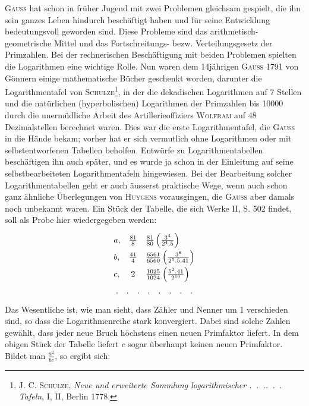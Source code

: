 \textsc{Gauss} hat schon in früher Jugend mit zwei Problemen gleichsam gespielt,
die ihn sein ganzes Leben hindurch beschäftigt haben und für seine Entwicklung bedeutungsvoll geworden sind. Diese Probleme sind das arithmetisch-geometrische Mittel und das Fortschreitungs- bezw. Verteilungsgesetz der Primzahlen. Bei der rechnerischen Beschäftigung mit beiden Problemen spielten
die Logarithmen eine wichtige Rolle. Nun waren dem 14jährigen \textsc{Gauss}
1791 von Gönnern einige mathematische Bücher geschenkt worden, darunter
die Logarithmentafel von \textsc{Schulze}\footnote{\textsc{J. C. Schulze}, \textit{Neue und erweiterte Sammlung logarithmischer .\, .\, .\enspace .\, .\, . Tafeln}, I, II, Berlin 1778.}, in der die dekadischen Logarithmen auf
7 Stellen und die natürlichen (hyperbolischen) Logarithmen der Primzahlen
bis 10000 durch die unermüdliche Arbeit des Artillerieoffiziers \textsc{Wolfram} auf
48 Dezimalstellen berechnet waren. Dies war die erste Logarithmentafel, die
\textsc{Gauss} in die Hände bekam; vorher hat er sich vermutlich ohne Logarithmen
oder mit selbstentworfenen Tabellen beholfen. Entwürfe zu Logarithmentabellen beschäftigen ihn auch später, und es wurde ja schon in der Einleitung auf seine selbstbearbeiteten Logarithmentafeln hingewiesen. Bei der
Bearbeitung solcher Logarithmentabellen geht er auch äusserst praktische
Wege, wenn auch schon ganz ähnliche Überlegungen von \textsc{Huygens} vorausgingen, die \textsc{Gauss} aber damals noch unbekannt waren. Ein Stück der Tabelle, die sich Werke II, S. 502 findet, soll als Probe hier wiedergegeben
werden:
\[
\renewcommand{\arraystretch}{1.65}
\begin{array}{l@{\quad}c@{\quad}l}
a,&\frac{81}{8}&\frac{81}{80}\left(\frac{3^4}{2^4\mathpunct{.}5}\right)\\
b,&\frac{41}{4}&\frac{6561}{6560}\left(\frac{3^8}{2^5\mathpunct{.}5\mathpunct{.}41}\right)\\
c,&2&\frac{1025}{1024}\left(\frac{5^2\mathpunct{.}41}{2^{10}}\right)\\
\multicolumn{3}{c}{.\quad .\quad .\quad .\quad .\quad .\quad .\quad .}
\end{array}
\]
\noindent Das Wesentliche ist, wie man sieht, dass Zähler und Nenner um 1 verschieden sind, so dass die Logarithmenreihe stark konvergiert. Dabei sind
solche Zahlen gewählt, dass jeder neue Bruch höchstens einen neuen Primfaktor liefert. In dem obigen Stück der Tabelle liefert $c$ sogar überhaupt
keinen neuen Primfaktor. Bildet man $\frac{a^2}{bc}$, so ergibt sich:
\par\clearpage{}
